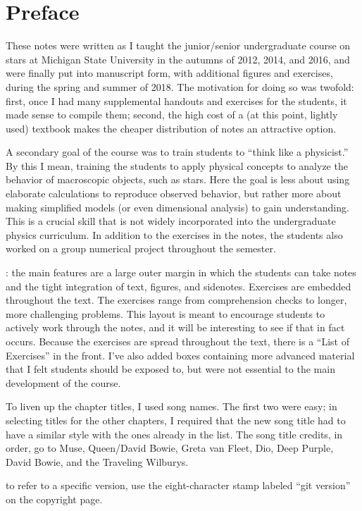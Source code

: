 
\section*{Preface}
These notes were written as I taught the junior/senior undergraduate course on stars at Michigan State University in the autumns of 2012, 2014, and 2016, and were finally put into manuscript form, with additional figures and exercises, during the spring and summer of 2018. The motivation for doing so was twofold: first, once I had many supplemental handouts and exercises for the students, it made sense to compile them; second, the high cost of a (at this point, lightly used) textbook makes the cheaper distribution of notes an attractive option.

A secondary goal of the course was to train students to ``think like a physicist.'' By this I mean, training the students to apply physical concepts to analyze the behavior of macroscopic objects, such as stars. Here the goal is less about using elaborate calculations to reproduce observed behavior, but rather more about making simplified models (or even dimensional analysis) to gain understanding. This is a crucial skill that is not widely incorporated into the undergraduate physics curriculum. In addition to the exercises in the notes, the students also worked on a group numerical project throughout the semester.

: the main features are a large outer margin in which the students can take notes and the tight integration of text, figures, and sidenotes. Exercises are embedded throughout the text. The exercises range from comprehension checks to longer, more challenging problems. This layout is meant to encourage students to actively work through the notes, and it will be interesting to see if that in fact occurs. Because the exercises are spread throughout the text, there is a ``List of Exercises'' in the front. I've also added boxes containing more advanced material that I felt students should be exposed to, but were not essential to the main development of the course. 

To liven up the chapter titles, I used song names. The first two were easy; in selecting titles for the other chapters, I required that the new song title had to have a similar style with the ones already in the list. The song title credits, in order, go to Muse, Queen/David Bowie, Greta van Fleet, Dio, Deep Purple, David Bowie, and the Traveling Wilburys.

 to refer to a specific version, use the eight-character stamp labeled ``git version'' on the copyright page.
